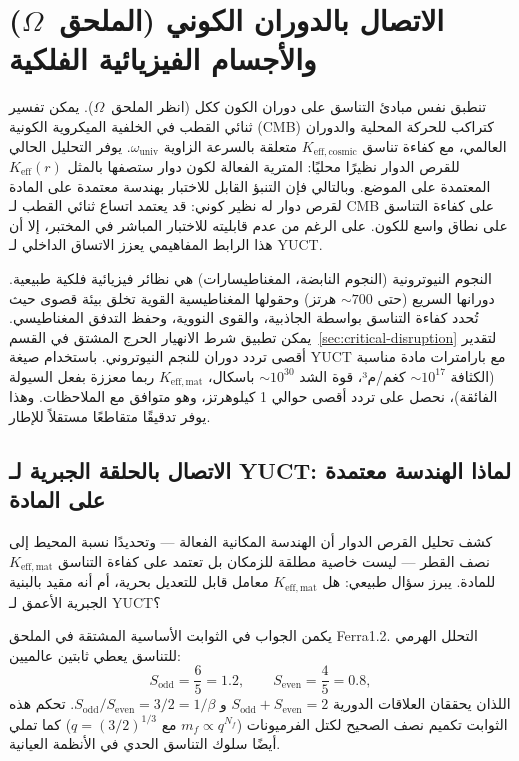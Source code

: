 \documentclass[12pt,a4paper]{article}
\begin{document}
	\section{الاتصال بالدوران الكوني (الملحق~\(\Omega\)) والأجسام الفيزيائية الفلكية}
	\label{sec:cosmic}
	
	تنطبق نفس مبادئ التناسق على دوران الكون ككل (انظر الملحق~\(\Omega\)). يمكن تفسير ثنائي القطب في الخلفية الميكروية الكونية (CMB) كتراكب للحركة المحلية والدوران العالمي، مع كفاءة تناسق \(K_{\mathrm{eff,cosmic}}\) متعلقة بالسرعة الزاوية \(\omega_{\text{univ}}\). يوفر التحليل الحالي للقرص الدوار نظيرًا محليًا: المترية الفعالة لكون دوار ستصفها بالمثل \(K_{\mathrm{eff}}(r)\) المعتمدة على الموضع. وبالتالي فإن التنبؤ القابل للاختبار بهندسة معتمدة على المادة لقرص دوار له نظير كوني: قد يعتمد اتساع ثنائي القطب لـ CMB على كفاءة التناسق على نطاق واسع للكون. على الرغم من عدم قابليته للاختبار المباشر في المختبر، إلا أن هذا الرابط المفاهيمي يعزز الاتساق الداخلي لـ YUCT.
	
	النجوم النيوترونية (النجوم النابضة، المغناطيسارات) هي نظائر فيزيائية فلكية طبيعية. دورانها السريع (حتى \(\sim 700\) هرتز) وحقولها المغناطيسية القوية تخلق بيئة قصوى حيث تُحدد كفاءة التناسق بواسطة الجاذبية، والقوى النووية، وحفظ التدفق المغناطيسي. يمكن تطبيق شرط الانهيار الحرج المشتق في القسم~\ref{sec:critical-disruption} لتقدير أقصى تردد دوران للنجم النيوتروني. باستخدام صيغة YUCT مع بارامترات مادة مناسبة (الكثافة \(\sim 10^{17}\) كغم/م³، قوة الشد \(\sim 10^{30}\) باسكال، \(K_{\mathrm{eff,mat}}\) ربما معززة بفعل السيولة الفائقة)، نحصل على تردد أقصى حوالي 1 كيلوهرتز، وهو متوافق مع الملاحظات. وهذا يوفر تدقيقًا متقاطعًا مستقلاً للإطار.
	
	\subsection{الاتصال بالحلقة الجبرية لـ YUCT: لماذا الهندسة معتمدة على المادة}
	\label{subsec:ehrenfest-algebraic-loop}
	
	كشف تحليل القرص الدوار أن الهندسة المكانية الفعالة — وتحديدًا نسبة المحيط إلى نصف القطر — ليست خاصية مطلقة للزمكان بل تعتمد على كفاءة التناسق \(K_{\mathrm{eff,mat}}\) للمادة. يبرز سؤال طبيعي: هل \(K_{\mathrm{eff,mat}}\) معامل قابل للتعديل بحرية، أم أنه مقيد بالبنية الجبرية الأعمق لـ YUCT؟
	
	يكمن الجواب في الثوابت الأساسية المشتقة في الملحق Ferra1.2. التحلل الهرمي للتناسق يعطي ثابتين عالميين:
	\[
	S_{\mathrm{odd}} = \frac{6}{5} = 1.2,\qquad S_{\mathrm{even}} = \frac{4}{5} = 0.8,
	\]
	اللذان يحققان العلاقات الدورية \(S_{\mathrm{odd}}+S_{\mathrm{even}}=2\) و \(S_{\mathrm{odd}}/S_{\mathrm{even}} = 3/2 = 1/\beta\). تحكم هذه الثوابت تكميم نصف الصحيح لكتل الفرميونات (\(m_f \propto q^{N_f}\) مع \(q = (3/2)^{1/3}\)) كما تملي أيضًا سلوك التناسق الحدي في الأنظمة العيانية.
	
\end{document}
